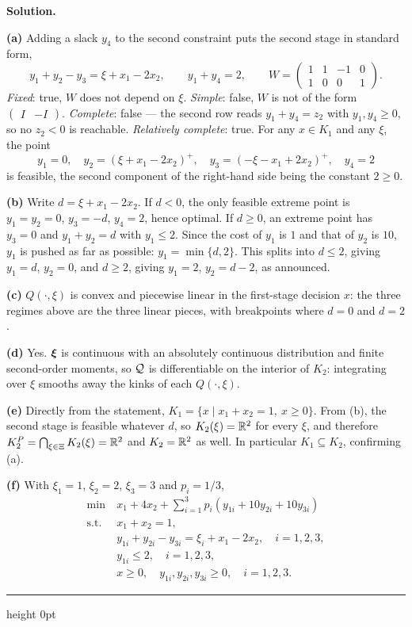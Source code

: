 \documentclass[11pt]{article}
\newenvironment{solution}
    {\par\nobreak\smallskip\noindent\textbf{Solution.}\par\nobreak\smallskip}
    {\par\medskip\hrule height 0pt\medskip}
\begin{document}
\begin{solution}
\textbf{(a)} Adding a slack $y_4$ to the second constraint puts the second stage
in standard form,
\[
y_1 + y_2 - y_3 = \xi + x_1 - 2x_2, \qquad y_1 + y_4 = 2,
\qquad
W = \begin{pmatrix} 1 & 1 & -1 & 0 \\ 1 & 0 & 0 & 1 \end{pmatrix}.
\]
\emph{Fixed}: true, $W$ does not depend on $\xi$.
\emph{Simple}: false, $W$ is not of the form $\begin{pmatrix} I & -I\end{pmatrix}$.
\emph{Complete}: false --- the second row reads $y_1 + y_4 = z_2$ with
$y_1, y_4 \geq 0$, so no $z_2 < 0$ is reachable.
\emph{Relatively complete}: true. For any $x \in K_1$ and any $\xi$, the point
\[
y_1 = 0, \quad y_2 = (\xi + x_1 - 2x_2)^+, \quad y_3 = (-\xi - x_1 + 2x_2)^+, \quad y_4 = 2
\]
is feasible, the second component of the right-hand side being the constant $2 \geq 0$.

\textbf{(b)} Write $d = \xi + x_1 - 2x_2$. If $d < 0$, the only feasible extreme
point is $y_1 = y_2 = 0$, $y_3 = -d$, $y_4 = 2$, hence optimal. If $d \geq 0$,
an extreme point has $y_3 = 0$ and $y_1 + y_2 = d$ with $y_1 \leq 2$. Since the
cost of $y_1$ is $1$ and that of $y_2$ is $10$, $y_1$ is pushed as far as
possible: $y_1 = \min\lbrace d, 2 \rbrace$. This splits into $d \leq 2$, giving
$y_1 = d$, $y_2 = 0$, and $d \geq 2$, giving $y_1 = 2$, $y_2 = d-2$, as announced.

\textbf{(c)} $Q(\cdot,\xi)$ is convex and piecewise linear in the first-stage
decision $x$: the three regimes above are the three linear pieces, with
breakpoints where $d = 0$ and $d = 2$.

\textbf{(d)} Yes. ${\boldsymbol{\xi}}$ is continuous with an absolutely continuous
distribution and finite second-order moments, so ${\mathcal{Q}}$ is differentiable on the
interior of $K_2$: integrating over $\xi$ smooths away the kinks of each
$Q(\cdot,\xi)$.

\textbf{(e)} Directly from the statement,
$K_1 = \lbrace x \mid x_1 + x_2 = 1,\ x \geq 0 \rbrace$.
From (b), the second stage is feasible whatever $d$, so
$K_2(\xi) = {\mathbb{R}}^2$ for every $\xi$, and therefore
$K_2^P = \bigcap_{\xi \in \Xi} K_2(\xi) = {\mathbb{R}}^2$ and $K_2 = {\mathbb{R}}^2$ as well.
In particular $K_1 \subseteq K_2$, confirming (a).

\textbf{(f)} With $\xi_1 = 1$, $\xi_2 = 2$, $\xi_3 = 3$ and $p_i = 1/3$,
\begin{align*}
\min\ & x_1 + 4x_2 + \sum_{i=1}^3 p_i\left(y_{1i} + 10y_{2i} + 10y_{3i}\right) \\
\text{s.t. } & x_1 + x_2 = 1, \\
& y_{1i} + y_{2i} - y_{3i} = \xi_i + x_1 - 2x_2, \quad i = 1,2,3, \\
& y_{1i} \leq 2, \quad i = 1,2,3, \\
& x \geq 0, \quad y_{1i}, y_{2i}, y_{3i} \geq 0, \quad i = 1,2,3.
\end{align*}
\end{solution}
\end{document}

